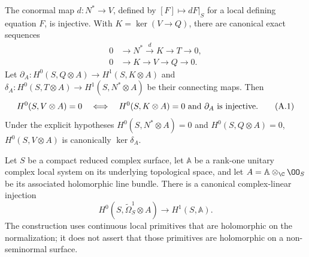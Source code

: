 
\begin{proposition}\label{cdp:st:A.1.1}
\label{wbII:prop:criterion}\label{wbII:prop:filtration}\label{wbII:lem:conormal}\label{wbII:lem:conormal-injective}\label{wbII:prop:missing-global-section-criterion}\label{wbII:prop:missing-cotangent-filtration}
The conormal map $d:N^*\to V$, defined by $[F]\mapsto dF|_S$ for a local defining equation $F$, is injective. With $K=\ker(V\to Q)$, there are canonical exact sequences
\begin{align}
0&\longrightarrow N^*\xrightarrow{d}K\longrightarrow T\longrightarrow0,
\label{cdp:A:filtration1}\\
0&\longrightarrow K\longrightarrow V\longrightarrow Q\longrightarrow0.
\label{cdp:A:filtration2}
\end{align}
Let $\partial_A:H^0(S,Q\otimes A)\to H^1(S,K\otimes A)$ and $\delta_A:H^0(S,T\otimes A)\to H^1(S,N^*\otimes A)$ be their connecting maps. Then
\[
 H^0(S,V\otimes A)=0
 \quad\Longleftrightarrow\quad
 H^0(S,K\otimes A)=0\ \hbox{and}\ \partial_A\hbox{ is injective}.
\tag{A.1}\label{cdp:eq:A.1}
\]
Under the explicit hypotheses $H^0(S,N^*\otimes A)=0$ and $H^0(S,Q\otimes A)=0$, $H^0(S,V\otimes A)$ is canonically $\ker\delta_A$.
\end{proposition}

\begin{proposition}\label{cdp:st:A.4.7}

Let $S$ be a compact reduced complex surface, let $\mathbb A$ be a rank-one unitary complex local system on its underlying topological space, and let $A=\mathbb A\otimes_{\C}\OO_S$ be its associated holomorphic line bundle. There is a canonical complex-linear injection
\[
 H^0(S,\widetilde\Omega_S^1\otimes A)
       \longrightarrow H^1(S,\mathbb A).
 \tag{A.20}\label{cdp:eq:A.20}
\]
The construction uses continuous local primitives that are holomorphic on the normalization; it does not assert that those primitives are holomorphic on a non-seminormal surface.
\end{proposition}

